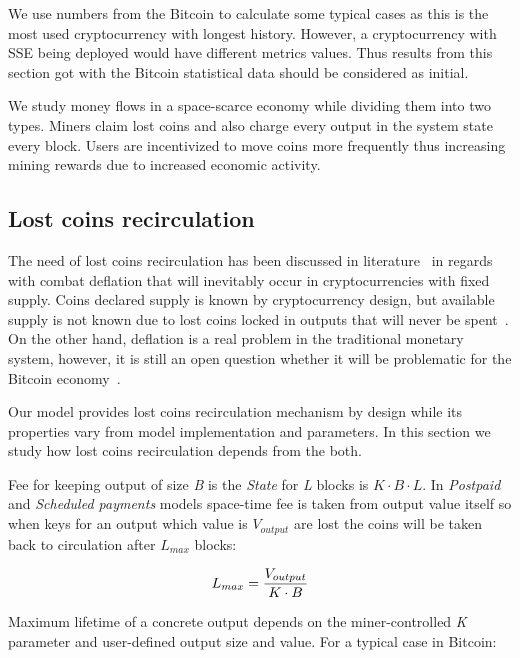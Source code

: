 \documentclass[]{article}   %
\newcommand{\state}{\textit{State}}
\begin{document}
We use numbers from the Bitcoin to calculate some typical cases as this is the most used cryptocurrency with longest history. However, a cryptocurrency with SSE being deployed would have different metrics values. Thus results from this section got with the Bitcoin statistical data should be considered as initial.

We study money flows in a space-scarce economy while dividing them into two types. Miners claim lost coins and also charge every output in the system state every block. Users are incentivized to move coins more frequently thus increasing mining rewards due to increased economic activity.  

\subsection{Lost coins recirculation}
\label{sec:re}

The need of lost coins recirculation has been discussed in literature~\cite{gjermundrod2014recirculating, gjermundrod2016going} in regards with combat deflation that will inevitably occur in cryptocurrencies with fixed supply. Coins declared supply is known by cryptocurrency design, but available supply is not known due to lost coins locked in outputs that will never be spent~\cite{ron2013quantitative}. On the other hand, deflation is a real problem in the traditional monetary system, however, it is still an open question whether it will be problematic for the Bitcoin economy~\cite{bitcoinDeflationarySpiral, barber2012bitter}.


Our model provides lost coins recirculation mechanism by design while its properties vary from model implementation and parameters. In this section we study how lost coins recirculation depends from the both.

Fee for keeping output of size \textit{B} is the \state{} for \textit{L} blocks is ${K \cdot B \cdot L}$. In \textit{Postpaid} and \textit{Scheduled payments} models space-time fee is taken from output value itself so when keys for an output which value is \textit{$V_{output}$} are lost the coins will be taken back to circulation after \textit{$L_{max}$} blocks: 

\begin{equation}
{L_{max} = {V_{output} \over K \cdot B}}
\end{equation}

Maximum lifetime of a concrete output depends on the miner-controlled \textit{K} parameter and user-defined output size and value. For a typical case in Bitcoin:
\end{document}
